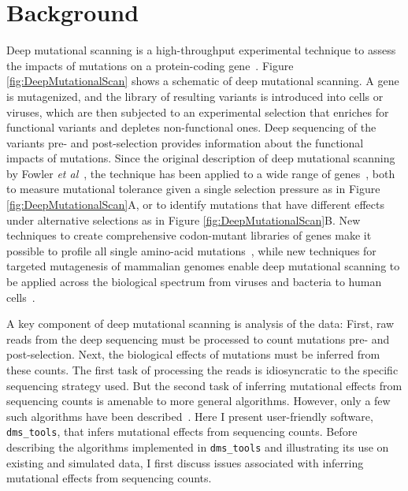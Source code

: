 \documentclass[twocolumn]{bmcart}%
\begin{document}
\section*{Background}
Deep mutational scanning is a high-throughput experimental technique to assess the impacts of mutations on a protein-coding gene~\cite{fowler2014deep}. Figure \ref{fig:DeepMutationalScan} shows a schematic of deep mutational scanning. A gene is mutagenized, and the library of resulting variants is introduced into cells or viruses, which are then subjected to an experimental selection that enriches for functional variants and depletes non-functional ones. Deep sequencing of the variants pre- and post-selection provides information about the functional impacts of mutations. Since the original description of deep mutational scanning by Fowler \textit{et al}~\cite{fowler2010high}, the technique has been applied to a wide range of genes~\cite{traxlmayr2012construction,mclaughlin2012spatial,starita2013activity,melamed2013deep,roscoe2013analyses,firnberg2014comprehensive,bloom2014experimentally,melnikov2014comprehensive,thyagarajan2014inherent,wu2014high,wu2014ns,olson2014comprehensive}, both to measure mutational tolerance given a single selection pressure as in Figure \ref{fig:DeepMutationalScan}A, or to identify mutations that have different effects under alternative selections as in Figure \ref{fig:DeepMutationalScan}B. New techniques to create comprehensive codon-mutant libraries of genes make it possible to profile all single amino-acid mutations~\cite{firnberg2012,jain2013rapid,firnberg2014comprehensive,bloom2014experimentally,melnikov2014comprehensive}, while new techniques for targeted mutagenesis of mammalian genomes enable deep mutational scanning to be applied across the biological spectrum from viruses and bacteria to human cells~\cite{findlay2014saturation}.

A key component of deep mutational scanning is analysis of the data: First, raw reads from the deep sequencing must be processed to count mutations pre- and post-selection. Next, the biological effects of mutations must be inferred from these counts. The first task of processing the reads is idiosyncratic to the specific sequencing strategy used. But the second task of inferring mutational effects from sequencing counts is amenable to more general algorithms. However, only a few such algorithms have been described~\cite{fowler2011enrich,bank2014bayesian}. Here I present user-friendly software, \texttt{dms\_tools}, that infers mutational effects from sequencing counts. Before describing the algorithms implemented in \texttt{dms\_tools} and illustrating its use on existing and simulated data, I first discuss issues associated with inferring mutational effects from sequencing counts.
\end{document}
